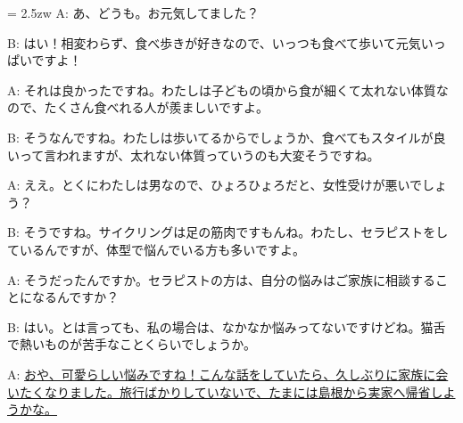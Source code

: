 \documentclass[11pt]{amsart}
\title{}
\author{}
\newenvironment{hangall}[1]{\hangindent = 2.5zw\everypar{\hangindent = 2.5zw}}{}
\begin{document}
\maketitle
\begin{hangall}{}%
A: あ、どうも。お元気してました？

B: はい！相変わらず、食べ歩きが好きなので、いっつも食べて歩いて元気いっぱいですよ！

A: それは良かったですね。わたしは子どもの頃から食が細くて太れない体質なので、たくさん食べれる人が羨ましいですよ。

B: そうなんですね。わたしは歩いてるからでしょうか、食べてもスタイルが良いって言われますが、太れない体質っていうのも大変そうですね。

A: ええ。とくにわたしは男なので、ひょろひょろだと、女性受けが悪いでしょう？

B: そうですね。サイクリングは足の筋肉ですもんね。わたし、セラピストをしているんですが、体型で悩んでいる方も多いですよ。

A: そうだったんですか。セラピストの方は、自分の悩みはご家族に相談することになるんですか？

B: はい。とは言っても、私の場合は、なかなか悩みってないですけどね。猫舌で熱いものが苦手なことくらいでしょうか。

A: \ul{おや、可愛らしい悩みですね！こんな話をしていたら、久しぶりに家族に会いたくなりました。旅行ばかりしていないで、たまには島根から実家へ帰省しようかな。}\end{hangall}
\end{document}
